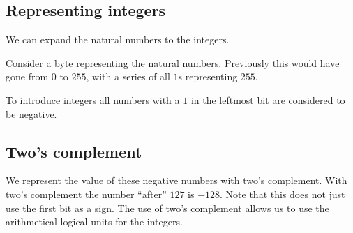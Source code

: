 
\subsection{Representing integers}

We can expand the natural numbers to the integers.

Consider a byte representing the natural numbers. Previously this would have gone from \(0\) to \(255\), with a series of all \(1\)s representing \(255\).

To introduce integers all numbers with a \(1\) in the leftmost bit are considered to be negative.

\subsection{Two's complement}

We represent the value of these negative numbers with two’s complement. With two’s complement the number “after” \(127\) is \(-128\). Note that this does not just use the first bit as a sign. The use of two’s complement allows us to use the arithmetical logical units for the integers.

